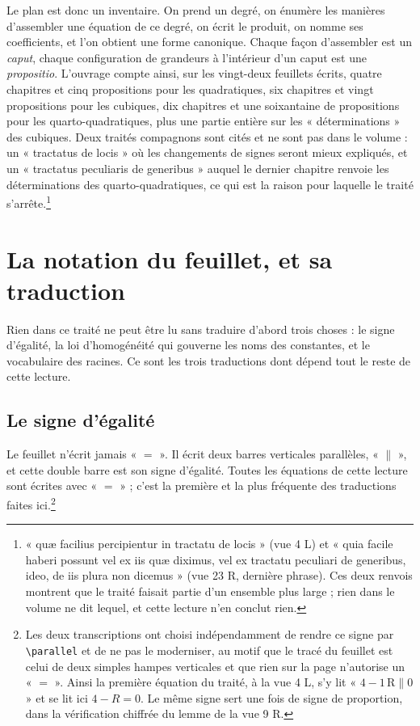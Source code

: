 \documentclass[11pt,a4paper]{article}
\begin{document}
Le plan est donc un inventaire. On prend un degré, on énumère les manières
d'assembler une équation de ce degré, on écrit le produit, on nomme ses
coefficients, et l'on obtient une forme canonique. Chaque façon d'assembler est
un \emph{caput}, chaque configuration de grandeurs à l'intérieur d'un caput est
une \emph{propositio}. L'ouvrage compte ainsi, sur les vingt-deux feuillets
écrits, quatre chapitres et cinq propositions pour les quadratiques, six
chapitres et vingt propositions pour les cubiques, dix chapitres et une
soixantaine de propositions pour les quarto-quadratiques, plus une partie
entière sur les « déterminations » des cubiques. Deux traités compagnons sont
cités et ne sont pas dans le volume : un « tractatus de locis » où les
changements de signes seront mieux expliqués, et un « tractatus peculiaris de
generibus » auquel le dernier chapitre renvoie les déterminations des
quarto-quadratiques, ce qui est la raison pour laquelle le traité
s'arrête.\footnote{« quæ facilius percipientur in tractatu de locis » (vue 4 L)
et « quia facile haberi possunt vel ex iis quæ diximus, vel ex tractatu
peculiari de generibus, ideo, de iis plura non dicemus » (vue 23 R, dernière
phrase). Ces deux renvois montrent que le traité faisait partie d'un ensemble
plus large ; rien dans le volume ne dit lequel, et cette lecture n'en conclut
rien.}

\section*{La notation du feuillet, et sa traduction}

Rien dans ce traité ne peut être lu sans traduire d'abord trois choses : le
signe d'égalité, la loi d'homogénéité qui gouverne les noms des constantes, et
le vocabulaire des racines. Ce sont les trois traductions dont dépend tout le
reste de cette lecture.

\subsection*{Le signe d'égalité}

Le feuillet n'écrit jamais « $=$ ». Il écrit deux barres verticales parallèles,
« $\parallel$ », et cette double barre est son signe d'égalité. Toutes les
équations de cette lecture sont écrites avec « $=$ » ; c'est la première et la
plus fréquente des traductions faites ici.\footnote{Les deux transcriptions ont
choisi indépendamment de rendre ce signe par \texttt{\textbackslash parallel}
et de ne pas le moderniser, au motif que le tracé du feuillet est celui de deux
simples hampes verticales et que rien sur la page n'autorise un « $=$ ». Ainsi
la première équation du traité, à la vue 4 L, s'y lit
« $4 - 1\,\mathrm{R} \parallel 0$ » et se lit ici $4 - R = 0$. Le même signe sert
une fois de signe de proportion, dans la vérification chiffrée du lemme de la
vue 9 R.}
\end{document}

